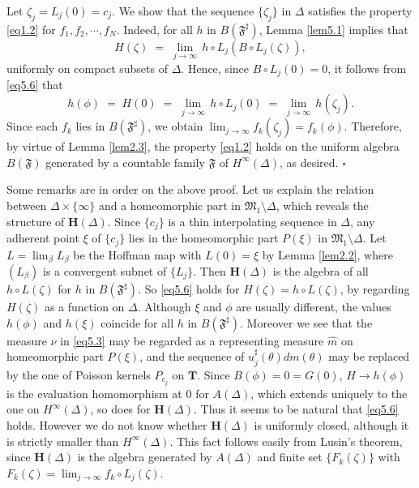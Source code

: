 \documentclass[12pt]{amsart}
\theoremstyle{plain}
\numberwithin{equation}{section}
\begin{document}
Let $\zeta_j = L_j(0) = c_j$. We show that the sequence $\{\zeta_j \}$
in $\Delta$ satisfies the property \eqref{eq1.2} for $f_1, f_2, \cdots, f_N $. Indeed, for all $h$ in $B(\mathfrak{F}^\sharp)$,
Lemma \ref{lem5.1} implies that
\begin{equation*}
H(\zeta)\;=\; \lim_{j\to\infty}\,h\circ L_j (B\circ L_j(\zeta)),
\end{equation*}
uniformly on compact subsets of $\Delta$. Hence, since $B\circ L_j(0)=0$,
it follows from \eqref{eq5.6} that
\begin{equation*}
h(\phi)\;=\;H(0)\;=\;\lim_{j\to\infty}\,h\circ L_j(0)
\;=\;\lim_{j\to\infty}\,h(\zeta_j).
\end{equation*}
Since each $f_k$ lies in $B(\mathfrak{F}^\sharp)$, we obtain
$\lim_{j\to \infty} f_k(\zeta_j) = f_k(\phi)$. Therefore,
by virtue of Lemma \ref{lem2.3}, the property \eqref{eq1.2} holds
on the uniform algebra $B(\mathfrak{F})$ generated by
a countable family $\mathfrak{F}$ of $H^\infty(\Delta)$,
as desired.
\hfill $\square$

\medskip

Some remarks are in order on the above proof.
Let us explain the relation between $\Delta\times \{\infty\}$ and
a homeomorphic part in $\mathfrak{M}_1\setminus \Delta$, which
reveals the structure of $\mathbf{H}(\Delta)$. Since $\{c_j\}$ is
a thin interpolating sequence in $\Delta$, any adherent point $\xi$
of $\{c_j\}$ lies in the homeomorphic part $P(\xi)$ in
$\mathfrak{M}_1\setminus \Delta$. Let $L= \lim_\beta L_\beta$ be
the Hoffman map with $L(0)=\xi$ by Lemma \ref{lem2.2},
where $(L_\beta)$ is a convergent subnet of $\{L_j\}$. Then
$\mathbf{H}(\Delta)$ is the algebra of all $h\circ L(\zeta)$
for $h$ in $B(\mathfrak{F}^\sharp)$. So \eqref{eq5.6} holds for
$H(\zeta)= h\circ L(\zeta)$, by regarding $H(\zeta)$ as a function
on $\Delta$. Although $\xi$ and
$\phi$ are usually different, the values $h(\phi)$ and $h(\xi)$
coincide for all $h$ in $B(\mathfrak{F}^\sharp)$.
Moreover we see that the measure $\widehat{\nu}$
in \eqref{eq5.3} may be regarded as a representing
measure $\widehat{m}$ on homeomorphic part
$P(\xi)$, and the sequence of $u^\sharp_j(\theta) dm(\theta)$
may be replaced by the one of Poisson kernels $P_{c_j}$
on $\mathbf{T}$.
Since $B(\phi) = 0 = G(0)$, $H \to h(\phi)$ is the evaluation
homomorphism at $0$ for $A(\Delta)$, which extends uniquely to the one on $H^\infty(\Delta)$, so does for $\mathbf{H}(\Delta)$. Thus it seems to be
natural that \eqref{eq5.6} holds.
However we do not know whether $\mathbf{H}(\Delta)$ is uniformly closed,
although it is strictly smaller than $H^\infty(\Delta)$.
This fact follows easily from Lusin's theorem, since
$\mathbf{H}(\Delta)$ is the algebra generated by
$A(\Delta)$ and finite set $\{F_k(\zeta)\}$
with $F_k(\zeta)=\lim_{j\to \infty} f_k\circ L_j(\zeta)$.
\end{document}
